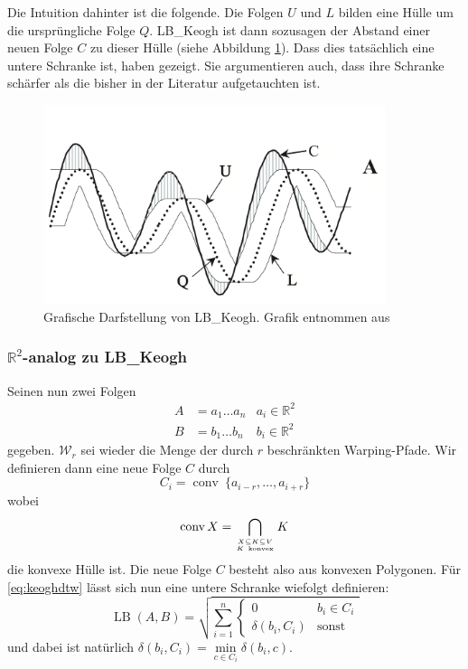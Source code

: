 Die Intuition dahinter ist die folgende. Die Folgen $U$ und $L$ bilden eine Hülle um die ursprüngliche Folge $Q$. LB\_Keogh ist dann sozusagen der Abstand einer neuen Folge $C$ zu dieser Hülle (siehe Abbildung \ref{fig:lb_keogh}). Dass dies tatsächlich eine untere Schranke ist, haben \citet{Keogh:2005p7751} gezeigt. Sie argumentieren auch, dass ihre Schranke schärfer als die bisher in der Literatur aufgetauchten ist.

\begin{figure}
  \centering \includegraphics[width=10cm]{figures/lb-keogh.png}
  \caption{Grafische Darfstellung von LB\_Keogh. Grafik entnommen aus \cite{Keogh:2005p7751}}
  \label{fig:lb_keogh}
\end{figure}

\subsubsection{\(\mathbb{R}^2\)-analog zu LB\_Keogh}
\label{subs:lb_keogh_analog}

Seinen nun zwei Folgen
\begin{align}
  A &= a_1 \dots a_n  & a_i \in \mathbb{R}^2 \\
  B &= b_1 \dots b_n  & b_i \in \mathbb{R}^2
\end{align}
gegeben.
\( \mathcal{W}_r \) sei wieder die Menge der durch \(r\) beschränkten Warping-Pfade. Wir definieren dann eine neue Folge $C$ durch
\begin{equation}
  C_i = \operatorname{conv} ~\{ a_{i-r}, \dots, a_{i+r} \}
\end{equation}
wobei
\[
  \operatorname{conv} X = \bigcap_{X\subseteq K \subseteq V \atop K\ \mathrm{konvex}} K
\]
die konvexe Hülle ist. Die neue Folge $C$ besteht also aus konvexen Polygonen. Für \ref{eq:keoghdtw} lässt sich nun eine untere Schranke wiefolgt definieren:
\begin{equation}
  \label{eq:lbkeoghanalog}
  \operatorname{LB}(A,B) = \sqrt{\sum_{i=1}^n
  \begin{cases}
    0 & b_i \in C_i \\
    \delta(b_i, C_i) & \text{sonst}
  \end{cases}
  }
\end{equation}
und dabei ist natürlich \( \delta(b_i, C_i) = \min\limits_{c \in C_i} \delta(b_i, c) \).

